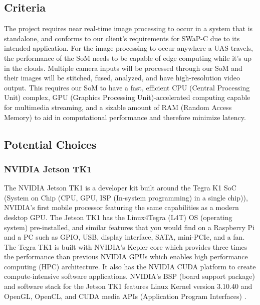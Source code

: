 \subsection{Criteria}

The project requires near real-time image processing to occur in a system that is 
standalone, and conforms to our client's requirements for SWaP-C due to its intended application. For the image processing to 
occur anywhere a UAS travels, the performance of the SoM 
needs to be capable of edge computing while it's up in the clouds.
Multiple camera inputs will be processed through our SoM and their images will be 
stitched, fused, analyzed, and have high-resolution video output. This requires our 
SoM to have a fast, efficient CPU (Central Processing Unit) complex, GPU 
(Graphics Processing Unit)-accelerated computing capable for multimedia streaming, and 
a sizable amount of RAM (Random Access Memory) to aid in computational performance 
and therefore minimize latency.\\

\subsection{Potential Choices}

\subsubsection{NVIDIA Jetson TK1}

The NVIDIA Jetson TK1 is a developer kit built around the Tegra K1 SoC (System 
on Chip (CPU, GPU, ISP (In-system programming) in a single chip)), NVIDIA's first 
mobile processor featuring the same capabilities as a 
modern desktop GPU\cite{JetsonTK1, TK1Wiki}. The Jetson TK1 has the Linux4Tegra (L4T)
OS (operating system) pre-installed, and similar features that you would find on a 
Raspberry Pi and a PC such as GPIO, USB, display interface, SATA, mini-PCIe, and a
fan\cite{RPiHDWR, TK1Wiki}. The Tegra TK1 is built with NVIDIA's Kepler core which 
provides three times the performance than previous NVIDIA GPUs which enables high 
performance computing (HPC) architecture. It also has the NVIDIA CUDA platform to 
create compute-intensive software applications\cite{KeplerArch}. NVIDIA's BSP (board 
support package) and software stack for the Jetson TK1 features Linux Kernel version 
3.10.40 and OpenGL, OpenCL, and CUDA media APIs (Application Program Interfaces)
\cite{TK1L4T}. \\

